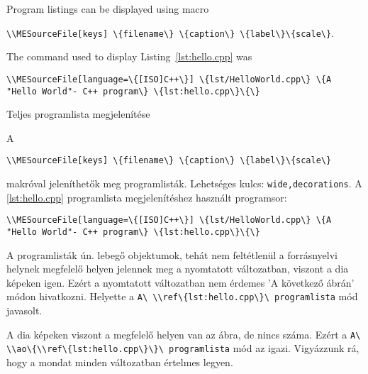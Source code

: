 
{


Program listings can be displayed using macro
\par\noindent\lstinline|\\MESourceFile[keys] \{filename\} \{caption\} \{label\}\{scale\}|.
\par\noindent The command used to display Listing~\ref{lst:hello.cpp} was
\par\noindent\lstinline|\\MESourceFile[language=\{[ISO]C++\}] \{lst/HelloWorld.cpp\} \{A "Hello World"- C++ program\} \{lst:hello.cpp\}\{\}|

}
{Teljes programlista megjelenítése}
{
A
\par\noindent\lstinline|\\MESourceFile[keys] \{filename\} \{caption\} \{label\}\{scale\}|
\par\noindent makróval jeleníthetők meg programlisták.
Lehetséges kulcs: \lstinline|wide,decorations|.
A \ref{lst:hello.cpp} programlista megjelenítéshez használt programsor:
\par\noindent\lstinline|\\MESourceFile[language=\{[ISO]C++\}] \{lst/HelloWorld.cpp\} \{A "Hello World"- C++ program\} \{lst:hello.cpp\}\{\}|



A programlisták ún. lebegő objektumok, tehát nem feltétlenül a forrásnyelvi helynek 
megfelelő helyen jelennek meg a nyomtatott változatban, viszont a dia képeken igen.
Ezért a nyomtatott változatban nem érdemes 'A következő ábrán' módon hivatkozni. Helyette
a \lstinline|A\ \\ref\{lst:hello.cpp\}\ programlista| mód javasolt.

A dia képeken viszont  a megfelelő helyen van az ábra, de nincs száma.
Ezért a \lstinline|A\ \\ao\{\\ref\{lst:hello.cpp\}\}\ programlista| mód az igazi.
Vigyázzunk rá, hogy a mondat minden változatban értelmes legyen.
}

